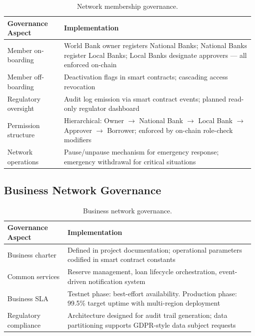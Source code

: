 \documentclass[12pt,a4paper]{report}
\newcommand{\tableheadfont}{\bfseries\small\color{PrimaryBlue}}
\newenvironment{moderntable}[1][H]{%
    \begin{table}[#1]\centering\small%
    \renewcommand{\arraystretch}{1.35}%
}{%
    \end{table}%
}
\begin{document}
\begin{moderntable}
\caption{Network membership governance.}
\begin{tabular}{@{} >{\raggedright}p{3.5cm} >{\raggedright\arraybackslash}p{8.5cm} @{}}
\toprule
\tableheadfont Governance Aspect & \tableheadfont Implementation \\
\midrule
\rowcolor{RowShade}
Member on-boarding & World Bank owner registers National Banks; National Banks register Local Banks; Local Banks designate approvers --- all enforced on-chain \\
Member off-boarding & Deactivation flags in smart contracts; cascading access revocation \\
\rowcolor{RowShade}
Regulatory oversight & Audit log emission via smart contract events; planned read-only regulator dashboard \\
Permission structure & Hierarchical: Owner $\to$ National Bank $\to$ Local Bank $\to$ Approver $\to$ Borrower; enforced by on-chain role-check modifiers \\
\rowcolor{RowShade}
Network operations & Pause/unpause mechanism for emergency response; emergency withdrawal for critical situations \\
\bottomrule
\end{tabular}
\end{moderntable}

\subsection{Business Network Governance}

\begin{moderntable}
\caption{Business network governance.}
\begin{tabular}{@{} >{\raggedright}p{3.5cm} >{\raggedright\arraybackslash}p{8.5cm} @{}}
\toprule
\tableheadfont Governance Aspect & \tableheadfont Implementation \\
\midrule
\rowcolor{RowShade}
Business charter & Defined in project documentation; operational parameters codified in smart contract constants \\
Common services & Reserve management, loan lifecycle orchestration, event-driven notification system \\
\rowcolor{RowShade}
Business SLA & Testnet phase: best-effort availability. Production phase: 99.5\% target uptime with multi-region deployment \\
Regulatory compliance & Architecture designed for audit trail generation; data partitioning supports GDPR-style data subject requests \\
\bottomrule
\end{tabular}
\end{moderntable}
\end{document}

